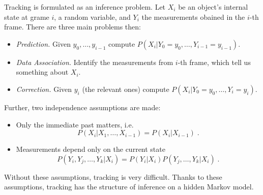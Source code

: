 \documentclass[a4paper,12pt]{article}
\begin{document}
Tracking is formulated as an inference problem. Let $X_i$ be an object's internal state at grame $i$, a random variable, and $Y_i$ the measurements obained in the $i$-th frame. There are three main problems then:
\begin{itemize}
\item {\it Prediction.} Given $y_0, \ldots, y_{i-1}$ compute $P(X_i|Y_0=y_0, \ldots, Y_{i-1} = y_{i-1})$.
\item {\it Data Association.} Identify the measurements from $i$-th frame, which tell us something about $X_i$.
\item {\it Correction.} Given $y_i$ (the relevant ones) compute $P(X_i|Y_0=y_0, \ldots, Y_i = y_i)$.
\end{itemize}
Further, two independence assumptions are made:
\begin{itemize}
\item Only the immediate past matters, i.e. $$P(X_i|X_1, \ldots, X_{i-1}) = P(X_i|X_{i-1})\;.$$
\item Measurements depend only on the current state $$P(Y_i, Y_j, \ldots, Y_k|X_i) = P(Y_i|X_i) P(Y_j, \ldots, Y_k|X_i)\;.$$
\end{itemize}
Without these assumptions, tracking is very difficult. Thanks to these assumptions, tracking has the structure of inference on a hidden Markov model.
\end{document}
